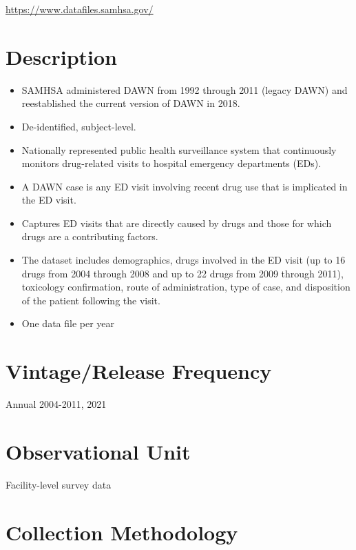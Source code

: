 \documentclass[
]{book}
\providecommand{\tightlist}{%
  \setlength{\itemsep}{0pt}\setlength{\parskip}{0pt}}
\begin{document}
\url{https://www.datafiles.samhsa.gov/}

\hypertarget{description-23}{%
\section{Description}\label{description-23}}

\begin{itemize}
\tightlist
\item
  SAMHSA administered DAWN from 1992 through 2011 (legacy DAWN) and reestablished the current version of DAWN in 2018.
\item
  De-identified, subject-level.
\item
  Nationally represented public health surveillance system that continuously monitors drug-related visits to hospital emergency departments (EDs).
\item
  A DAWN case is any ED visit involving recent drug use that is implicated in the ED visit.
\item
  Captures ED visits that are directly caused by drugs and those for which drugs are a contributing factors.
\item
  The dataset includes demographics, drugs involved in the ED visit (up to 16 drugs from 2004 through 2008 and up to 22 drugs from 2009 through 2011), toxicology confirmation, route of administration, type of case, and disposition of the patient following the visit.
\item
  One data file per year
\end{itemize}

\hypertarget{vintagerelease-frequency-23}{%
\section{Vintage/Release Frequency}\label{vintagerelease-frequency-23}}

Annual 2004-2011, 2021

\hypertarget{observational-unit-23}{%
\section{Observational Unit}\label{observational-unit-23}}

Facility-level survey data

\hypertarget{collection-methodology-23}{%
\section{Collection Methodology}\label{collection-methodology-23}}
\end{document}
